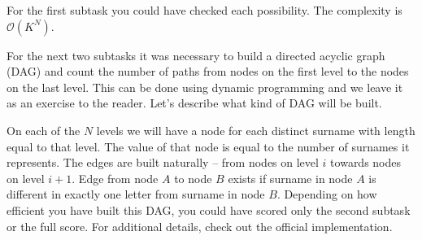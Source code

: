 \documentclass[a4paper]{article}
\begin{document}
For the first subtask you could have checked each possibility. The complexity
is $\mathcal{O}(K^N)$.

For the next two subtasks it was necessary to build a directed acyclic graph
(DAG) and count the number of paths from nodes on the first level to the nodes
on the last level. This can be done using dynamic programming and we leave
it as an exercise to the reader. Let's describe what kind of DAG will be built.

On each of the $N$ levels we will have a node for each distinct surname with
length equal to that level. The value of that node is equal to the number
of surnames it represents. The edges are built naturally -- from nodes on level
$i$ towards nodes on level $i+1$. Edge from node $A$ to node $B$ exists if surname
in node $A$ is different in exactly one letter from surname in node $B$.
Depending on how efficient you have built this DAG, you could have scored only
the second subtask or the full score. For additional details, check out the
official implementation.
\end{document}
